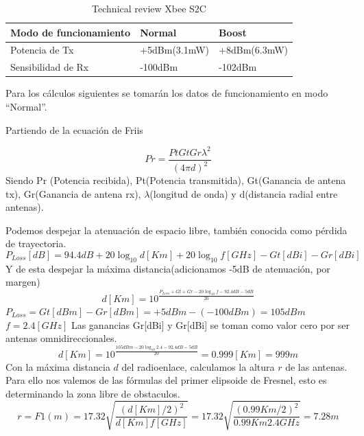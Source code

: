 \documentclass[11pt,oneside,spanish,a4paper]{article}
\begin{document}
\begin{table}[h]
	\centering
	\begin{tabular}{l l l}
		\hline
		\textbf{Modo de funcionamiento} & \textbf{Normal} & \textbf{Boost}\\
		\hline
		Potencia de Tx & +5dBm(3.1mW) & +8dBm(6.3mW) \\
		Sensibilidad de Rx & -100dBm & -102dBm\\
		\hline
	\end{tabular}
	\caption{Technical review Xbee S2C}
\end{table}
Para los c\'alculos siguientes se tomar\'an los datos de funcionamiento en modo ``Normal''.

Partiendo de la ecuaci\'on de Friis\cite[Pág. 48]{bilb:Friis}




\begin{equation*}
\label{Ec:Friis}
Pr = \frac{Pt Gt Gr \lambda ^{2}}{(4\pi d)^2}
\end{equation*}
Siendo Pr (Potencia recibida), Pt(Potencia transmitida), Gt(Ganancia de antena tx), Gr(Ganancia de antena rx), $\lambda$(longitud de onda) y d(distancia radial entre antenas).

Podemos despejar la atenuaci\'on de espacio libre, tambi\'en conocida
como p\'erdida de trayectoria\cite[Pág. 32]{bilb:Free}.
\begin{equation*}
\label{Ec:perdida}
P_{Loss}[dB] = 94.4 dB + 20 \log_{10}d [Km] + 20 \log_{10}f [GHz] - Gt[dBi] - Gr[dBi]
\end{equation*}
Y de esta despejar la m\'axima distancia(adicionamos -5dB de atenuaci\'on, por margen)
\begin{equation*}
\label{Ec:distancia}
d[Km] = 10^{\frac{P_{Loss} + Gt + Gr - 20 \log_{10}f - 92.4dB -5dB}{20}}
\end{equation*}
$P_{Loss}=Gt[dBm] - Gr[dBm] = +5dBm - (-100dBm) = 105dBm$
$f = 2.4 [GHz]$
Las ganancias Gr[dBi] y Gr[dBi] se toman como valor cero por ser antenas omnidireccionales.
\begin{equation*}
\label{Ec:distancia1}
d[Km] = 10^{\frac{105 dBm - 20 \log_{10}2.4 - 92.4dB-5dB}{20}} = 0.999 [Km] =999m
\end{equation*}	
Con la m\'axima distancia $d$ del radioenlace, calculamos la altura
$r$ de las antenas. Para ello nos valemos de las f\'ormulas del primer
elipsoide de Fresnel, esto es determinando la zona libre de
obstaculos\cite[Pág. 40]{bilb:Free}.
\begin{equation*}
\label{Ec:fresnel}
r = F1(m) = 17.32 \sqrt{\frac{(d[Km]/2)^2}{d[Km]f[GHz]}} = 17.32 \sqrt{\frac{(0.99Km/2)^2}{0.99Km2.4GHz}} = 7.28m
\end{equation*}	
\end{document}
